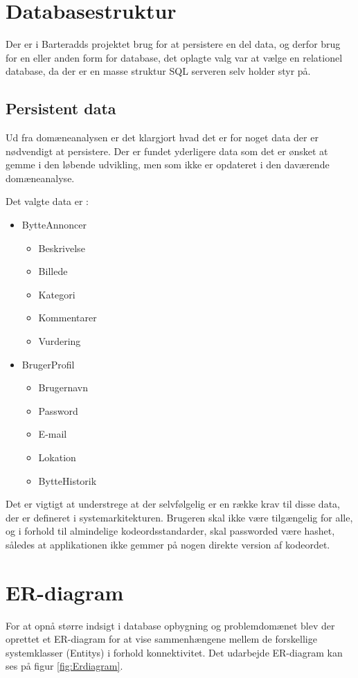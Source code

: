 \section{Databasestruktur}
Der er i Barteradds projektet brug for at persistere en del data, og derfor brug for en eller anden form for database, det oplagte valg var at vælge en relationel database, da der er en masse struktur SQL serveren selv holder styr på.

\subsection{Persistent data}
Ud fra domæneanalysen er det klargjort hvad det er for noget data der er nødvendigt at persistere. Der er fundet yderligere data som det er ønsket at gemme i den løbende udvikling, men som ikke er opdateret i den daværende domæneanalyse.

Det valgte data er :
\begin{itemize}
	\item BytteAnnoncer
	\begin{itemize}
		\item Beskrivelse 
		\item Billede 
		\item Kategori
		\item Kommentarer
		\item Vurdering
	\end{itemize}
	\item BrugerProfil
	\begin{itemize}
		\item Brugernavn
		\item Password
		\item E-mail
		\item Lokation
		\item BytteHistorik
	\end{itemize}
\end{itemize} 

Det er vigtigt at understrege at der selvfølgelig er en række krav til disse data, der er defineret i systemarkitekturen. Brugeren skal ikke være tilgængelig for alle, og i forhold til almindelige kodeordsstandarder, skal passworded være hashet, således at applikationen ikke gemmer på nogen direkte version af kodeordet. 

\section{ER-diagram}
For at opnå større indsigt i database opbygning og problemdomænet blev der oprettet et ER-diagram for at vise sammenhængene mellem de forskellige systemklasser (Entitys) i forhold konnektivitet. Det udarbejde ER-diagram kan ses på figur \ref{fig:Erdiagram}.

